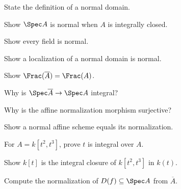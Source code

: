 \begin{exercise}\label{exer:vi28-01}
State the definition of a normal domain.
\end{exercise}

\begin{exercise}\label{exer:vi28-02}
Show $\Spec A$ is normal when $A$ is integrally closed.
\end{exercise}

\begin{exercise}[VI.28.E3: Field]\label{exer:vi28-03}
Show every field is normal.
\end{exercise}

\begin{exercise}[VI.28.E4: Localization]\label{exer:vi28-04}
Show a localization of a normal domain is normal.
\end{exercise}

\begin{exercise}\label{exer:vi28-05}
Show $\Frac(\overline A)=\Frac(A)$.
\end{exercise}

\begin{exercise}\label{exer:vi28-06}
Why is $\Spec\overline A\to\Spec A$ integral?
\end{exercise}

\begin{exercise}[VI.28.E7: Surjectivity]\label{exer:vi28-07}
Why is the affine normalization morphism surjective?
\end{exercise}

\begin{exercise}\label{exer:vi28-08}
Show a normal affine scheme equals its normalization.
\end{exercise}

\begin{exercise}\label{exer:vi28-09}
For $A=k[t^2,t^3]$, prove $t$ is integral over $A$.
\end{exercise}

\begin{exercise}\label{exer:vi28-10}
Show $k[t]$ is the integral closure of $k[t^2,t^3]$ in $k(t)$.
\end{exercise}

\begin{exercise}\label{exer:vi28-11}
Compute the normalization of $D(f)\subseteq\Spec A$ from $\overline A$.
\end{exercise}

